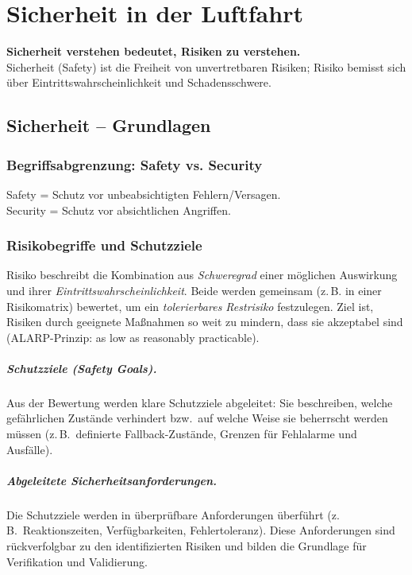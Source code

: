 \chapter{Sicherheit in der Luftfahrt}
\textbf{Sicherheit verstehen bedeutet, Risiken zu verstehen.}\\
Sicherheit (Safety) ist die Freiheit von unvertretbaren Risiken; Risiko bemisst sich über Eintrittswahrscheinlichkeit und Schadensschwere.

\section{Sicherheit – Grundlagen}

\subsection{Begriffsabgrenzung: Safety vs. Security}
Safety = Schutz vor unbeabsichtigten Fehlern/Versagen. \\
Security = Schutz vor absichtlichen Angriffen.\\

\subsection{Risikobegriffe und Schutzziele}
Risiko beschreibt die Kombination aus \emph{Schweregrad} einer möglichen Auswirkung und ihrer \emph{Eintrittswahrscheinlichkeit}. 
Beide werden gemeinsam (z.\,B. in einer Risikomatrix) bewertet, um ein \emph{tolerierbares Restrisiko} festzulegen. 
Ziel ist, Risiken durch geeignete Maßnahmen so weit zu mindern, dass sie akzeptabel sind (ALARP-Prinzip: as low as reasonably practicable).

\paragraph{Schutzziele (Safety Goals).}
Aus der Bewertung werden klare Schutzziele abgeleitet: Sie beschreiben, welche gefährlichen Zustände verhindert bzw.\ auf welche Weise sie beherrscht werden müssen (z.\,B.\ definierte Fallback-Zustände, Grenzen für Fehlalarme und Ausfälle).

\paragraph{Abgeleitete Sicherheitsanforderungen.}
Die Schutzziele werden in überprüfbare Anforderungen überführt (z.\,B.\ Reaktionszeiten, Verfügbarkeiten, Fehlertoleranz). 
Diese Anforderungen sind rückverfolgbar zu den identifizierten Risiken und bilden die Grundlage für Verifikation und Validierung.

